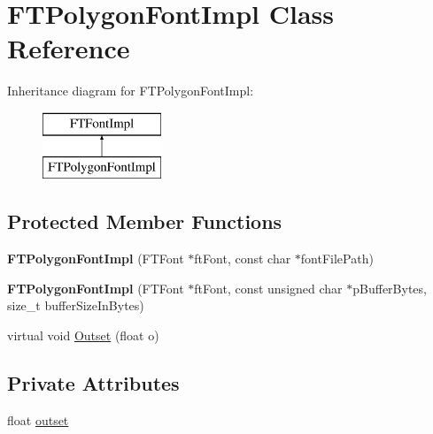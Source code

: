 \hypertarget{class_f_t_polygon_font_impl}{}\section{F\+T\+Polygon\+Font\+Impl Class Reference}
\label{class_f_t_polygon_font_impl}
Inheritance diagram for F\+T\+Polygon\+Font\+Impl\+:\begin{figure}[H]
\begin{center}
\leavevmode
\includegraphics[height=2.000000cm]{class_f_t_polygon_font_impl}
\end{center}
\end{figure}
\subsection*{Protected Member Functions}
\begin{DoxyCompactItemize}
\item 
{\bfseries F\+T\+Polygon\+Font\+Impl} (F\+T\+Font $\ast$ft\+Font, const char $\ast$font\+File\+Path)\hypertarget{class_f_t_polygon_font_impl_adbe87469ee12af1a0a1b7999ede7cc98}{}\label{class_f_t_polygon_font_impl_adbe87469ee12af1a0a1b7999ede7cc98}

\item 
{\bfseries F\+T\+Polygon\+Font\+Impl} (F\+T\+Font $\ast$ft\+Font, const unsigned char $\ast$p\+Buffer\+Bytes, size\+\_\+t buffer\+Size\+In\+Bytes)\hypertarget{class_f_t_polygon_font_impl_a140310c1898543ff1dec5865841b630b}{}\label{class_f_t_polygon_font_impl_a140310c1898543ff1dec5865841b630b}

\item 
virtual void \hyperlink{class_f_t_polygon_font_impl_ac565010b774c7ddb84db28b422ea9b3e}{Outset} (float o)
\end{DoxyCompactItemize}
\subsection*{Private Attributes}
\begin{DoxyCompactItemize}
\item 
float \hyperlink{class_f_t_polygon_font_impl_a60c09e7962dace23ef2efc6599e1430d}{outset}
\end{DoxyCompactItemize}
